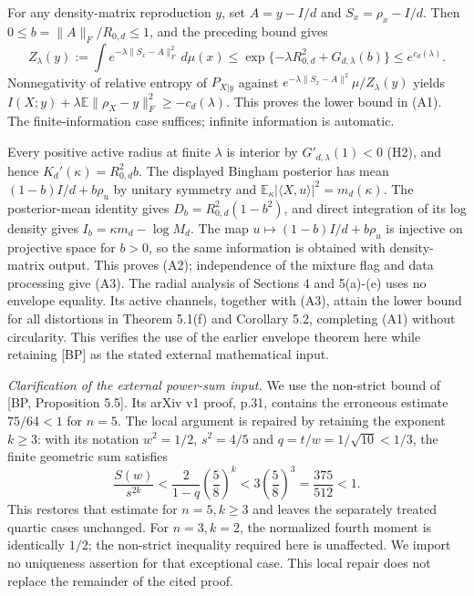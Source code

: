 \documentclass[
  11pt,
  a4paper,
]{article}
\begin{document}
For any density-matrix reproduction \(y\), set \(A=y-I/d\) and
\(S_x=\rho_x-I/d\). Then \(0\le b=\|A\|_F/R_{0,\allowbreak{}d}\le1\), and the
preceding bound gives
\[Z_\lambda(y):=\int e^{-\lambda\|S_x-A\|_F^2}\,d\mu(x)\le \exp\{-\lambda R_{0,d}^2+G_{d,\lambda}(b)\}\le e^{c_d(\lambda)}.\]
Nonnegativity of relative entropy of \(P_{X|y}\) against
\(e^{-\lambda\|S_x-A\|^2}\mu/Z_\lambda(y)\) yields
\(I(X;\allowbreak{}y)+\lambda\mathbb E\|\rho_X-y\|_F^2\ge-c_d(\lambda)\). This proves
the lower bound in (A1). The finite-information case suffices; infinite
information is automatic.

Every positive active radius at finite \(\lambda\) is interior by
\(G'_{d,\allowbreak{}\lambda}(1)<0\) (H2), and hence \(K_d'(\kappa)=R_{0,\allowbreak{}d}^2b\). The
displayed Bingham posterior has mean \((1-b)I/d+b\rho_u\) by unitary
symmetry and \(\mathbb E_\kappa |\langle X,\allowbreak{}u\rangle|^2=m_d(\kappa)\).
The posterior-mean identity gives \(D_b=R_{0,\allowbreak{}d}^2(1-b^2)\), and direct
integration of its log density gives \(I_b=\kappa m_d-\log M_d\). The
map \(u\mapsto(1-b)I/d+b\rho_u\) is injective on projective space for
\(b>0\), so the same information is obtained with density-matrix output.
This proves (A2); independence of the mixture flag and data processing
give (A3). The radial analysis of Sections 4 and 5(a)-(e) uses no
envelope equality. Its active channels, together with (A3), attain the
lower bound for all distortions in Theorem 5.1(f) and Corollary 5.2,
completing (A1) without circularity. This verifies the use of the
earlier envelope theorem here while retaining {[}BP{]} as the stated
external mathematical input.

\emph{Clarification of the external power-sum input.} We use the
non-strict bound of {[}BP, Proposition 5.5{]}. Its arXiv v1 proof, p.31,
contains the erroneous estimate \(75/64<1\) for \(n=5\). The local
argument is repaired by retaining the exponent \(k\ge3\): with its
notation \(w^2=1/2\), \(s^2=4/5\) and \(q=t/w=1/\sqrt{10}<1/3\), the
finite geometric sum satisfies
\[\frac{S(w)}{s^{2k}}<\frac{2}{1-q}\left(\frac58\right)^k<3\left(\frac58\right)^3=\frac{375}{512}<1.\]
This restores that estimate for \(n=5,\allowbreak{}k\ge3\) and leaves the separately
treated quartic cases unchanged. For \(n=3,\allowbreak{}k=2\), the normalized fourth
moment is identically \(1/2\); the non-strict inequality required here
is unaffected. We import no uniqueness assertion for that exceptional
case. This local repair does not replace the remainder of the cited
proof.
\end{document}
